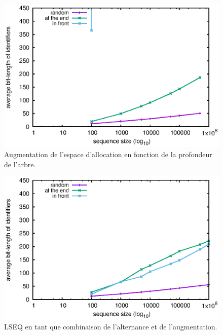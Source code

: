 \begin{figure}
  \centering
  \includegraphics{./img/double.eps}
  \caption{\label{fig:logoot}Augmentation de l'espace d'allocation en fonction de 
    la profondeur de l'arbre.}
\end{figure}

\begin{figure}
  \centering
  \includegraphics{./img/lseq.eps}
  \caption{\label{fig:logoot}LSEQ en tant que combinaison de l'alternance et de
    l'augmentation.}
\end{figure}

